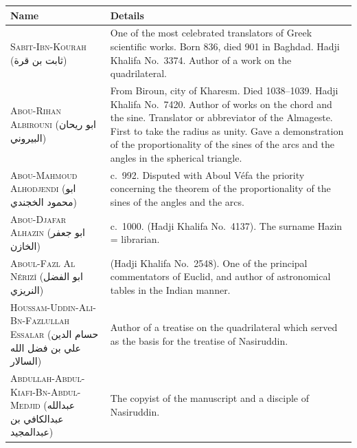\documentclass[11pt,a4paper]{article}
\theoremstyle{plain}
\theoremstyle{definition}
\theoremstyle{remark}
\newcommand{\ar}[1]{{\arabicfont\beginR #1\endR}}
\begin{document}
\begin{center}
\begin{longtable}{lp{9cm}}
\toprule
\textbf{Name} & \textbf{Details} \\
\midrule
\endhead

\textsc{Sabit-Ibn-Kourah} (\ar{ثابت بن قرة}) & One of the most celebrated translators of Greek scientific works. Born 836, died 901 in Baghdad. Hadji Khalifa No.~3374. Author of a work on the quadrilateral. \\
\addlinespace[0.2cm]

\textsc{Abou-Rihan Albirouni} (\ar{ابو ريحان البيروني}) & From Biroun, city of Kharesm. Died 1038--1039. Hadji Khalifa No.~7420. Author of works on the chord and the sine. Translator or abbreviator of the Almageste. First to take the radius as unity. Gave a demonstration of the proportionality of the sines of the arcs and the angles in the spherical triangle. \\
\addlinespace[0.2cm]

\textsc{Abou-Mahmoud Alhodjendi} (\ar{ابو محمود الخجندي}) & c.~992. Disputed with Aboul Véfa the priority concerning the theorem of the proportionality of the sines of the angles and the arcs. \\
\addlinespace[0.2cm]

\textsc{Abou-Djafar Alhazin} (\ar{ابو جعفر الخازن}) & c.~1000. (Hadji Khalifa No.~4137). The surname Hazin = librarian. \\
\addlinespace[0.2cm]

\textsc{Aboul-Fazl Al Nérizî} (\ar{ابو الفضل النريزي}) & (Hadji Khalifa No.~2548). One of the principal commentators of Euclid, and author of astronomical tables in the Indian manner. \\
\addlinespace[0.2cm]

\textsc{Houssam-Uddin-Ali-Bn-Fazlullah Essalar} (\ar{حسام الدين علي بن فضل الله السالار}) & Author of a treatise on the quadrilateral which served as the basis for the treatise of Nasiruddin. \\
\addlinespace[0.2cm]

\textsc{Abdullah-Abdul-Kiafi-Bn-Abdul-Medjid} (\ar{عبدالله عبدالكافي بن عبدالمجيد}) & The copyist of the manuscript and a disciple of Nasiruddin. \\

\bottomrule
\end{longtable}
\end{center}

\clearpage

\end{document}

